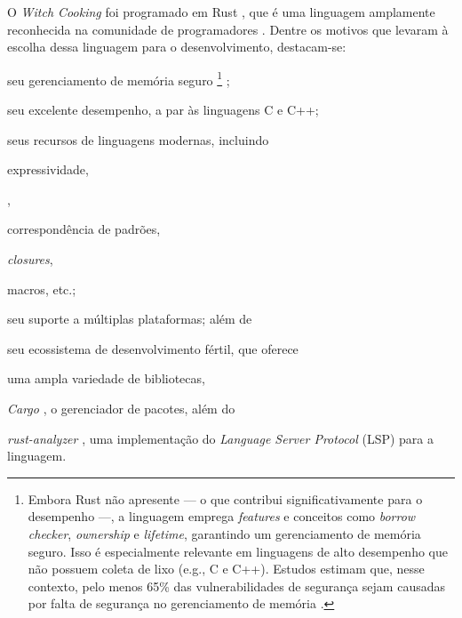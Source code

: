 \documentclass
  [11pt,a4paper,english,brazil,openright,sumario=tradicional,twoside]
  {abntex2}
\newcommand{\witchcooking}{\textit{Witch Cooking}\xspace}
\begin{document}
  O \witchcooking foi programado em Rust \cite{rust-2023-rust}, que é uma
  linguagem amplamente reconhecida na comunidade de programadores
  \cite{stack-overflow-2023-stack}. Dentre os motivos que levaram à escolha
  dessa linguagem para o desenvolvimento, destacam-se:
  \begin{inparaenum}
    \item seu gerenciamento de memória seguro%
          \footnote
            { Embora Rust não apresente \textit{} ---
              o que contribui significativamente para o desempenho ---, a
              linguagem emprega \textit{features} e conceitos como
              \textit{borrow checker}, \textit{ownership} e \textit{lifetime},
              garantindo um gerenciamento de memória seguro. Isso é
              especialmente relevante em linguagens de alto desempenho que não
              possuem coleta de lixo (e.g., C e C++). Estudos estimam que,
              nesse contexto, pelo menos 65\% das vulnerabilidades de segurança
              sejam causadas por falta de segurança no gerenciamento de memória
              \cite{gaynor-2020-what}.}
          \cite[3]{nsa-2022-software};
    \item seu excelente desempenho, a par às linguagens C e C++;
    \item seus recursos de linguagens modernas, incluindo
          \begin{inparaenum}
            \item expressividade,
            \item \textit{},
            \item correspondência de padrões,
            \item \textit{closures},
            \item macros, etc.;
          \end{inparaenum}
    \item seu suporte a múltiplas plataformas; além de
    \item seu ecossistema de desenvolvimento fértil, que oferece
          \begin{inparaenum}
            \item uma ampla variedade de bibliotecas,
            \item \textit{Cargo} \cite{rust-2023-cargo}, o gerenciador de
                  pacotes, além do
            \item \textit{rust-analyzer} \cite{rust-analyzer-2023-rust}, uma
                  implementação do \textit{Language Server Protocol} (LSP) para
                  a linguagem.
          \end{inparaenum}
  \end{inparaenum}
\end{document}
